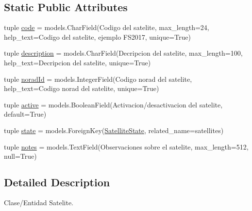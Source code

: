 \subsection*{Static Public Attributes}
\begin{DoxyCompactItemize}
\item 
tuple \hyperlink{class_ground_segment_1_1models_1_1_satellite_1_1_satellite_ae4a43a1ee941bff4914f4fed1e2775a1}{code} = models.\+Char\+Field(\textquotesingle{}Codigo del satelite\textquotesingle{}, max\+\_\+length=24, help\+\_\+text=\textquotesingle{}Codigo del satelite, ejemplo F\+S2017\textquotesingle{}, unique=True)
\item 
tuple \hyperlink{class_ground_segment_1_1models_1_1_satellite_1_1_satellite_a076215a5d0896cf97edbf312c7605000}{description} = models.\+Char\+Field(\textquotesingle{}Decripcion del satelite\textquotesingle{}, max\+\_\+length=100, help\+\_\+text=\textquotesingle{}Decripcion del satelite\textquotesingle{}, unique=True)
\item 
tuple \hyperlink{class_ground_segment_1_1models_1_1_satellite_1_1_satellite_a7962e5b81ff68f4fdedb33ce54bd4368}{norad\+Id} = models.\+Integer\+Field(\textquotesingle{}Codigo norad del satelite\textquotesingle{}, help\+\_\+text=\textquotesingle{}Codigo norad del satelite\textquotesingle{}, unique=True)
\item 
tuple \hyperlink{class_ground_segment_1_1models_1_1_satellite_1_1_satellite_a43cd47392c46ca0c6c7c92a8828d7d26}{active} = models.\+Boolean\+Field(\textquotesingle{}Activacion/desactivacion del satelite\textquotesingle{}, default=True)
\item 
tuple \hyperlink{class_ground_segment_1_1models_1_1_satellite_1_1_satellite_a4cdd4dae77da6f58058ca51ac71bd31d}{state} = models.\+Foreign\+Key(\hyperlink{class_ground_segment_1_1models_1_1_satellite_state_1_1_satellite_state}{Satellite\+State}, related\+\_\+name=\textquotesingle{}satellites\textquotesingle{})
\item 
tuple \hyperlink{class_ground_segment_1_1models_1_1_satellite_1_1_satellite_a6ae6b5fad6dd1a31200d8dd8e0ba07a0}{notes} = models.\+Text\+Field(\textquotesingle{}Observaciones sobre el satelite\textquotesingle{}, max\+\_\+length=512, null=True)
\end{DoxyCompactItemize}


\subsection{Detailed Description}
\begin{DoxyVerb}Clase/Entidad Satelite. 
\end{DoxyVerb}
 

